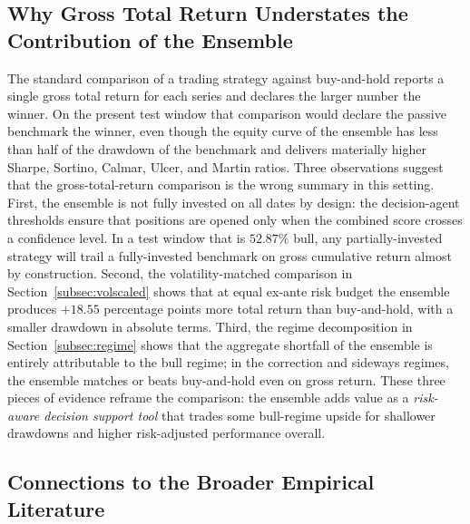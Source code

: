 \documentclass{ieeeaccess}
\newcommand{\VolScaledExcessPP}{\ensuremath{+18.55}}
\newcommand{\RegBullShare}{52.87\%}
\begin{document}
\subsection{Why Gross Total Return Understates the Contribution of the Ensemble}

The standard comparison of a trading strategy against buy-and-hold reports a single gross total return for each series and declares the larger number the winner. On the present test window that comparison would declare the passive benchmark the winner, even though the equity curve of the ensemble has less than half of the drawdown of the benchmark and delivers materially higher Sharpe, Sortino, Calmar, Ulcer, and Martin ratios. Three observations suggest that the gross-total-return comparison is the wrong summary in this setting. First, the ensemble is not fully invested on all dates by design: the decision-agent thresholds ensure that positions are opened only when the combined score crosses a confidence level. In a test window that is $\RegBullShare{}$ bull, any partially-invested strategy will trail a fully-invested benchmark on gross cumulative return almost by construction. Second, the volatility-matched comparison in Section~\ref{subsec:volscaled} shows that at equal ex-ante risk budget the ensemble produces $\VolScaledExcessPP{}$ percentage points more total return than buy-and-hold, with a smaller drawdown in absolute terms. Third, the regime decomposition in Section~\ref{subsec:regime} shows that the aggregate shortfall of the ensemble is entirely attributable to the bull regime; in the correction and sideways regimes, the ensemble matches or beats buy-and-hold even on gross return. These three pieces of evidence reframe the comparison: the ensemble adds value as a \emph{risk-aware decision support tool} that trades some bull-regime upside for shallower drawdowns and higher risk-adjusted performance overall.

\subsection{Connections to the Broader Empirical Literature}
\end{document}
